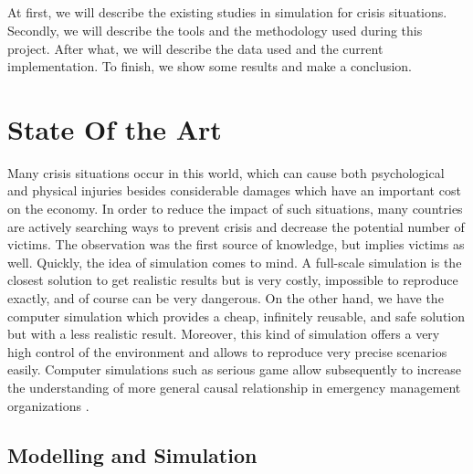 \documentclass[12pt, a4paper]{memoir} %
\begin{document}
	\paragraph{}
	At first, we will describe the existing studies in simulation for crisis situations. Secondly, we will describe the tools and the methodology used during this project.
	After what, we will describe the data used and the current implementation. To finish, we show some results and make a conclusion.


\chapter{State Of the Art}

	Many crisis situations occur in this world, which can cause both psychological and physical injuries besides considerable damages which have an important cost on the economy.
	In order to reduce the impact of such situations, many countries are actively searching ways to prevent crisis and decrease the potential number of victims.
	The observation was the first source of knowledge, but implies victims as well. Quickly, the idea of simulation comes to mind.
	A full-scale simulation is the closest solution to get realistic results but is very costly, impossible to reproduce exactly, and of course can be very dangerous.
	On the other hand, we have the computer simulation which provides a cheap, infinitely reusable, and safe solution but with a less realistic result.
	Moreover, this kind of simulation offers a very high control of the environment and allows to reproduce very precise scenarios easily.
	Computer simulations such as serious game allow subsequently to increase the understanding of more general causal relationship in emergency management
	organizations \cite{ruijven2011}.

	\section{Modelling and Simulation}
\end{document}
